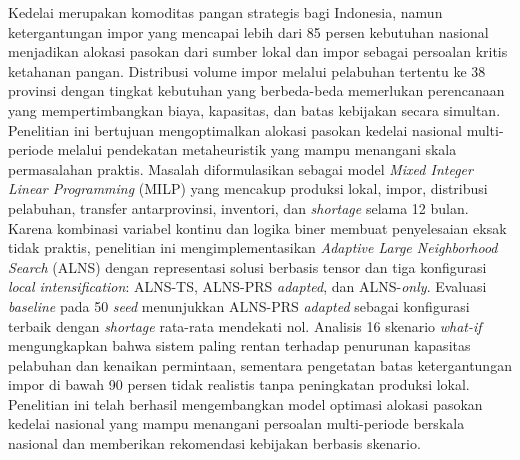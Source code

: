 \documentclass{file/TA-ITS}
\theoremstyle{definition}
\theoremstyle{definition}
\theoremstyle{plain}
\begin{document}

\Cover
\BagianAwal
\LembarJudul
\TitlePage
\LembarPengesahan
\LembarOrisinalitas



\begin{Abstrak}
Kedelai merupakan komoditas pangan strategis bagi Indonesia, namun ketergantungan impor yang mencapai lebih dari 85 persen kebutuhan nasional menjadikan alokasi pasokan dari sumber lokal dan impor sebagai persoalan kritis ketahanan pangan. Distribusi volume impor melalui pelabuhan tertentu ke 38 provinsi dengan tingkat kebutuhan yang berbeda-beda memerlukan perencanaan yang mempertimbangkan biaya, kapasitas, dan batas kebijakan secara simultan. Penelitian ini bertujuan mengoptimalkan alokasi pasokan kedelai nasional multi-periode melalui pendekatan metaheuristik yang mampu menangani skala permasalahan praktis. Masalah diformulasikan sebagai model \textit{Mixed Integer Linear Programming} (MILP) yang mencakup produksi lokal, impor, distribusi pelabuhan, transfer antarprovinsi, inventori, dan \textit{shortage} selama 12 bulan. Karena kombinasi variabel kontinu dan logika biner membuat penyelesaian eksak tidak praktis, penelitian ini mengimplementasikan \textit{Adaptive Large Neighborhood Search} (ALNS) dengan representasi solusi berbasis tensor dan tiga konfigurasi \textit{local intensification}: ALNS-TS, ALNS-PRS \textit{adapted}, dan ALNS-\textit{only}. Evaluasi \textit{baseline} pada 50 \textit{seed} menunjukkan ALNS-PRS \textit{adapted} sebagai konfigurasi terbaik dengan \textit{shortage} rata-rata mendekati nol. Analisis 16 skenario \textit{what-if} mengungkapkan bahwa sistem paling rentan terhadap penurunan kapasitas pelabuhan dan kenaikan permintaan, sementara pengetatan batas ketergantungan impor di bawah 90 persen tidak realistis tanpa peningkatan produksi lokal. Penelitian ini telah berhasil mengembangkan model optimasi alokasi pasokan kedelai nasional yang mampu menangani persoalan multi-periode berskala nasional dan memberikan rekomendasi kebijakan berbasis skenario.
\end{Abstrak}
\end{document}
